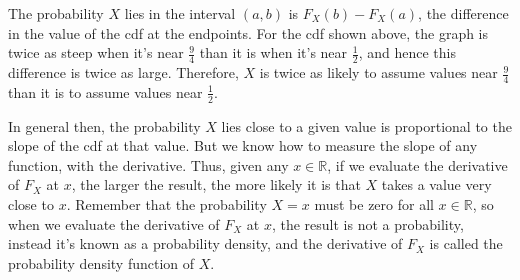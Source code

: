 \begin{center}
\end{center}

The probability $X$ lies in the interval $(a,b)$ is $F_X(b) - F_X(a)$, the difference in the value of the cdf at the endpoints. For the cdf shown above, the graph is twice as steep when it's near $\frac{9}{4}$ than it is when it's near $\frac{1}{2}$, and hence this difference is twice as large. Therefore, $X$ is twice as likely to assume values near $\frac{9}{4}$ than it is to assume values near $\frac{1}{2}$.

In general then, the probability $X$ lies close to a given value is proportional to the slope of the cdf at that value. But we know how to measure the slope of any function, with the derivative. Thus, given any $x \in \mathbb{R}$, if we evaluate the derivative of $F_X$ at $x$, the larger the result, the more likely it is that $X$ takes a value very close to $x$. Remember that the probability $X=x$ must be zero for all $x \in \mathbb{R}$, so when we evaluate the derivative of $F_X$ at $x$, the result is not a probability, instead it's known as a probability density, and the derivative of $F_X$ is called the probability density function of $X$. 

